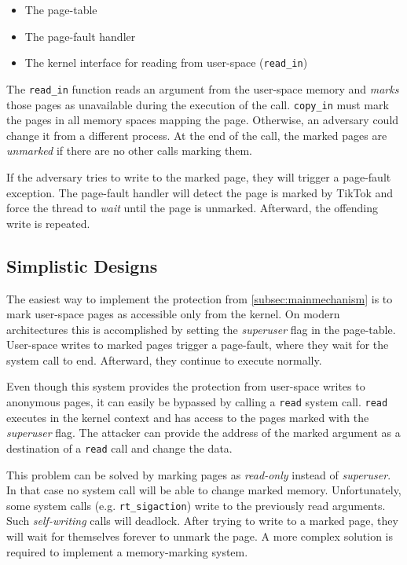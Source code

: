 \documentclass[conference]{IEEEtran}
\newcommand{\sysname}{TikTok}
\begin{document}
\begin{itemize}
\item The page-table
\item The page-fault handler
\item The kernel interface for reading from user-space (\texttt{read\_in})
\end{itemize}

The \texttt{read\_in} function reads an argument from the user-space memory and
\emph{marks} those pages as unavailable during the execution of the call.
\texttt{copy\_in} must mark the pages in all memory spaces mapping the page.
Otherwise, an adversary could change it from a different process. At the end of
the call, the marked pages are \emph{unmarked} if there are no other calls
marking them.

If the adversary tries to write to the marked page, they will trigger a page-fault
exception. The page-fault handler will detect the page is marked by \sysname{} and
force the thread to \emph{wait} until the page is unmarked. Afterward, the 
offending write is repeated. 


\subsection{Simplistic Designs}
\label{subsec:simplistic}
The easiest way to implement the protection from \autoref{subsec:mainmechanism}
is to mark user-space pages as accessible only from the kernel. On modern
architectures this is accomplished by setting the \emph{superuser} flag in the
page-table. User-space writes to marked pages trigger a page-fault, where they
wait for the system call to end. Afterward, they continue to execute normally.

Even though this system provides the protection from user-space
writes to anonymous pages, it can easily be bypassed by calling a \texttt{read}
system call. \texttt{read} executes in the kernel context and has access to 
the pages marked with the \emph{superuser} flag. The attacker can provide the
address of the marked argument as a destination of a \texttt{read} call and 
change the data.

This problem can be solved by marking pages as \emph{read-only} instead of
\emph{superuser}. In that case no system call will be able to change marked
memory. Unfortunately, some system calls (e.g. \texttt{rt\_sigaction}) write to
the previously read arguments. Such \emph{self-writing} calls will deadlock.
After trying to write to a marked page, they will wait for themselves forever to
unmark the page. A more complex solution is required to implement a
memory-marking system.
\end{document}
